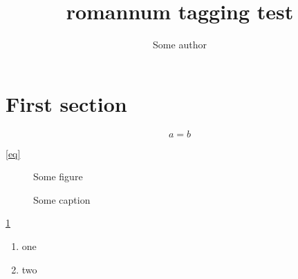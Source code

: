 \documentclass{article}
\title{romannum tagging test}
\author{Some author}
\begin{document}
\maketitle

\section{First section}

\begin{equation}
a=b \label{eq}
\end{equation}

\eqref{eq}

\begin{figure}
Some figure
\caption{Some caption}\label{fig}
\end{figure}

\ref{fig}

\begin{enumerate}
\item one
\item two
\end{enumerate}


\end{document}
